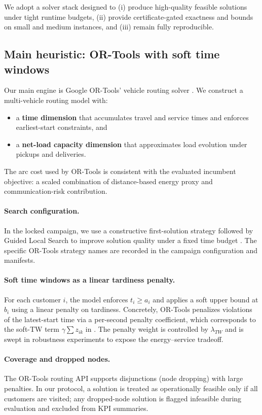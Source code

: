 \label{sec:methods}

We adopt a solver stack designed to (i) produce high-quality feasible solutions under tight runtime budgets, (ii) provide certificate-gated exactness and bounds on small and medium instances, and (iii) remain fully reproducible.

\subsection{Main heuristic: OR-Tools with soft time windows}
Our main engine is Google OR-Tools' vehicle routing solver \citep{ortools}. We construct a multi-vehicle routing model with:
\begin{itemize}[leftmargin=*]
\item a \textbf{time dimension} that accumulates travel and service times and enforces earliest-start constraints, and
\item a \textbf{net-load capacity dimension} that approximates load evolution under pickups and deliveries.
\end{itemize}
The arc cost used by OR-Tools is consistent with the evaluated incumbent objective: a scaled combination of distance-based energy proxy and communication-risk contribution.

\paragraph{Search configuration.}
In the locked campaign, we use a constructive first-solution strategy followed by Guided Local Search to improve solution quality under a fixed time budget \citep{kilby1999gls}. The specific OR-Tools strategy names are recorded in the campaign configuration and manifests.

\paragraph{Soft time windows as a linear tardiness penalty.}
For each customer $i$, the model enforces $t_i \ge a_i$ and applies a soft upper bound at $b_i$ using a linear penalty on tardiness. Concretely, OR-Tools penalizes violations of the latest-start time via a per-second penalty coefficient, which corresponds to the soft-TW term $\gamma\sum z_{ik}$ in . The penalty weight is controlled by $\lambda_{TW}$ and is swept in robustness experiments to expose the energy--service tradeoff.

\paragraph{Coverage and dropped nodes.}
The OR-Tools routing API supports disjunctions (node dropping) with large penalties. In our protocol, a solution is treated as operationally feasible only if all customers are visited; any dropped-node solution is flagged infeasible during evaluation and excluded from KPI summaries.

